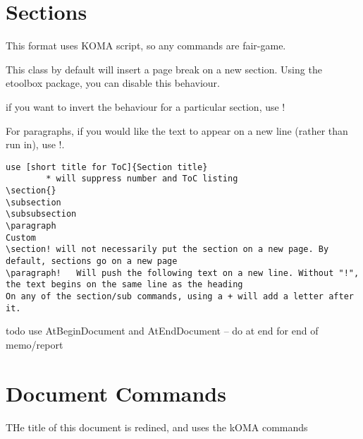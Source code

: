 \documentclass[compact]{corpboreport}
\begin{document}
\section{Sections}

This format uses KOMA script, so any commands are fair-game.

This class by default will insert a page break on a new section.
Using the etoolbox package, you can disable this behaviour.

if you want to invert the behaviour for a particular section, use !

For paragraphs, if you would like the text to appear on a new line (rather than run in), use !.

\lstset{language=tex}
\begin{lstlisting}
use [short title for ToC]{Section title}
		* will suppress number and ToC listing
\section{}
\subsection
\subsubsection
\paragraph
Custom
\section! will not necessarily put the section on a new page. By default, sections go on a new page
\paragraph!   Will push the following text on a new line. Without "!", the text begins on the same line as the heading
On any of the section/sub commands, using a + will add a letter after it.
\end{lstlisting}


todo use AtBeginDocument and AtEndDocument -- do at end for  end of memo/report

\section{Document Commands}
THe title of this document is redined, and uses the kOMA commands
\end{document}
